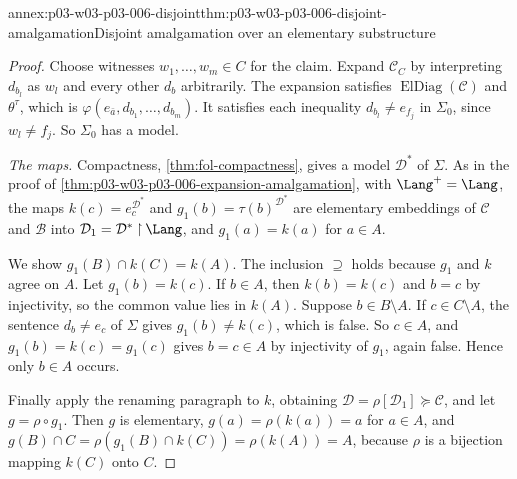 \begin{annexitem}{annex:p03-w03-p03-006-disjoint}{thm:p03-w03-p03-006-disjoint-amalgamation}{Disjoint amalgamation over an elementary substructure}
\begin{proof}
Choose witnesses \(w_1,\ldots,w_m\in C\) for the claim.  Expand
\(\mathcal C_C\) by interpreting \(d_{b_l}\) as \(w_l\) and every other
\(d_b\) arbitrarily.  The expansion satisfies
\(\operatorname{ElDiag}(\mathcal C)\) and \(\theta^\tau\), which is
\(\varphi(e_{\bar a},d_{b_1},\ldots,d_{b_m})\).  It satisfies each
inequality \(d_{b_l}\ne e_{f_j}\) in \(\Sigma_0\), since \(w_l\ne f_j\).
So \(\Sigma_0\) has a model.

\emph{The maps.}  Compactness, \cref{thm:fol-compactness}, gives a model
\(\mathcal D^*\) of \(\Sigma\).  As in the proof of
\cref{thm:p03-w03-p03-006-expansion-amalgamation}, with
\(\Lang^+=\Lang\), the maps \(k(c)=e_c^{\mathcal D^*}\) and
\(g_1(b)=\tau(b)^{\mathcal D^*}\) are elementary embeddings of
\(\mathcal C\) and \(\mathcal B\) into
\(\mathcal D_1=\mathcal D^*\mathbin{\upharpoonright}\Lang\), and
\(g_1(a)=k(a)\) for \(a\in A\).

We show \(g_1(B)\cap k(C)=k(A)\).  The inclusion \(\supseteq\) holds
because \(g_1\) and \(k\) agree on \(A\).  Let \(g_1(b)=k(c)\).  If
\(b\in A\), then \(k(b)=k(c)\) and \(b=c\) by injectivity, so the common
value lies in \(k(A)\).  Suppose \(b\in B\setminus A\).  If
\(c\in C\setminus A\), the sentence \(d_b\ne e_c\) of \(\Sigma\) gives
\(g_1(b)\ne k(c)\), which is false.  So \(c\in A\), and
\(g_1(b)=k(c)=g_1(c)\) gives \(b=c\in A\) by injectivity of \(g_1\), again
false.  Hence only \(b\in A\) occurs.

Finally apply the renaming paragraph to \(k\), obtaining
\(\mathcal D=\rho[\mathcal D_1]\succcurlyeq\mathcal C\), and let
\(g=\rho\circ g_1\).  Then \(g\) is elementary, \(g(a)=\rho(k(a))=a\) for
\(a\in A\), and
\(g(B)\cap C=\rho(g_1(B)\cap k(C))=\rho(k(A))=A\), because \(\rho\) is a
bijection mapping \(k(C)\) onto \(C\).
\end{proof}
\end{annexitem}

